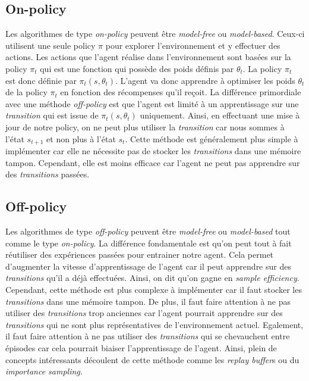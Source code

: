 \subsection{On-policy}

Les algorithmes de type \textit{on-policy} peuvent être \textit{model-free} ou \textit{model-based}. Ceux-ci utilisent une seule policy $\pi$ pour explorer l'environnement et y effectuer des actions. Les actions que l'agent réalise dans l'environnement sont basées sur la policy $\pi_t$ qui est une fonction qui possède des poids définis par $\theta_t$. La policy $\pi_t$ est donc définie par $\pi_t(s, \theta_t)$. L'agent va donc apprendre à optimiser les poids $\theta_t$ de la policy $\pi_t$ en fonction des récompenses qu'il reçoit. La différence primordiale avec une méthode \textit{off-policy} est que l'agent est limité à un apprentissage sur une \textit{transition} qui est issue de $\pi_t(s, \theta_t)$ uniquement. Ainsi, en effectuant une mise à jour de notre policy, on ne peut plus utiliser la \textit{transition} car nous sommes à l'état $s_{t+1}$ et non plus à l'état $s_t$. Cette méthode est généralement plus simple à implémenter car elle ne nécessite pas de stocker les \textit{transitions} dans une mémoire tampon. Cependant, elle est moins efficace car l'agent ne peut pas apprendre sur des \textit{transitions} passées.

\subsection{Off-policy}

Les algorithmes de type \textit{off-policy} peuvent être \textit{model-free} ou \textit{model-based} tout comme le type \textit{on-policy}. La différence fondamentale est qu'on peut tout à fait réutiliser des expériences passées pour entrainer notre agent. Cela permet d'augmenter la vitesse d'apprentissage de l'agent car il peut apprendre sur des \textit{transitions} qu'il a déjà effectuées. Ainsi, on dit qu'on gagne en \textit{sample efficiency}. Cependant, cette méthode est plus complexe à implémenter car il faut stocker les \textit{transitions} dans une mémoire tampon. De plus, il faut faire attention à ne pas utiliser des \textit{transitions} trop anciennes car l'agent pourrait apprendre sur des \textit{transitions} qui ne sont plus représentatives de l'environnement actuel. Egalement, il faut faire attention à ne pas utiliser des \textit{transitions} qui se chevauchent entre épisodes car cela pourrait biaiser l'apprentissage de l'agent. Ainsi, plein de concepts intéressants découlent de cette méthode comme les \textit{replay buffer}s ou du \textit{importance sampling}.